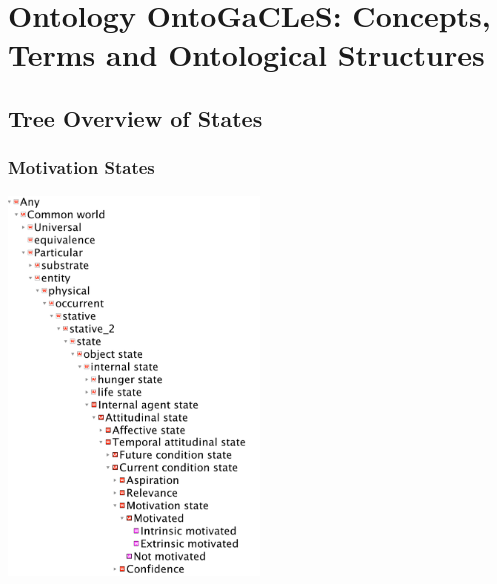 \chapter{Ontology OntoGaCLeS: Concepts, Terms and Ontological Structures}
\label{appendix:ontology-ontogacles}

\section{Tree Overview of States}
\label{sec:ontogacles:tree-overview-states}

\subsection{Motivation States}
\includegraphics[width=0.5\textwidth]{images/appendix/tree-overview-motivation-states.png} \newpage

\newpage

